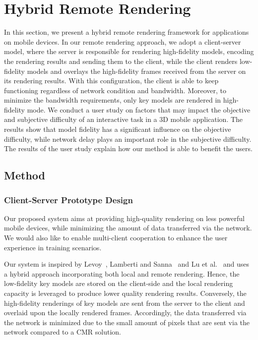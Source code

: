 \chapter{Hybrid Remote Rendering}
\label{chap:hrr}

In this section, we present a hybrid remote rendering framework for applications on mobile devices. In our remote rendering approach, we adopt a client-server model, where the server is responsible for rendering high-fidelity models, encoding the rendering results and sending them to the client, while the client renders low-fidelity models and overlays the high-fidelity frames received from the server on its rendering results. With this configuration, the client is able to keep functioning regardless of network condition and bandwidth. Moreover, to minimize the bandwidth requirements, only key models are rendered in high-fidelity mode. We conduct a user study on factors that may impact the objective and subjective difficulty of an interactive task in a 3D mobile application. The results show that model fidelity has a significant influence on the objective difficulty, while network delay plays an important role in the subjective difficulty. The results of the user study explain how our method is able to benefit the users.

\section{Method}
\label{sec:hrr:m}

\subsection{Client-Server Prototype Design}
\label{sec:hrr:m:cspd}

Our proposed system aims at providing high-quality rendering on less powerful mobile devices, while minimizing the amount of data transferred via the network. We would also like to enable multi-client cooperation to enhance the user experience in training scenarios.

Our system is inspired by Levoy~\cite{levoy1995}, Lamberti and Sanna~\cite{lamberti2007} and Lu et al.~\cite{lu2011} and uses a hybrid approach incorporating both local and remote rendering.
Hence, the low-fidelity key models are stored on the client-side and the local rendering capacity is leveraged to produce lower quality rendering results.
Conversely, the high-fidelity renderings of key models are sent from the server to the client and overlaid upon the locally rendered frames.
Accordingly, the data transferred via the network is minimized due to the small amount of pixels that are sent via the network compared to a CMR solution. 


